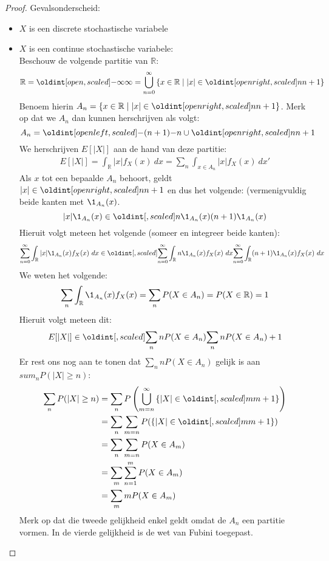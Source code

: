\documentclass[main.tex]{subfiles}
\begin{document}
\begin{st}
  \begin{proof}
    Gevalsonderscheid:
    \begin{itemize}
    \item $X$ is een discrete stochastische variabele
    \item $X$ is een continue stochastische variabele:\\
      Beschouw de volgende partitie van $\mathbb{R}$:
      \[ \mathbb{R} = \interval[open]{-\infty}{\infty} = \bigcup_{n=0}^{\infty}\left\{ x \in\mathbb{R} \mid |x| \in \interval[open right]{n}{n+1} \right\} \]
      Benoem hierin $A_{n}= \left\{ x \in\mathbb{R} \mid |x| \in \interval[open right]{n}{n+1} \right\}$.
      Merk op dat we $A_{n}$ dan kunnen herschrijven als volgt:
      \[ A_{n} = \interval[open left]{-(n+1)}{-n} \cup \interval[open right]{n}{n+1} \]
      We herschrijven $E[|X|]$ aan de hand van deze partitie:
      \begin{align}
        E[|X|]
        = \int_{\mathbb{R}}|x|f_{X}(x)\ dx
        = \sum_{n}\int_{x\in A_{n}}|x|f_{X}(x)\ dx'
      \end{align}
      Als $x$ tot een bepaalde $A_{n}$ behoort, geldt $|x| \in \interval[open right]{n}{n+1}$ en dus het volgende: (vermenigvuldig beide kanten met $\1_{A_{n}}(x)$.
      \[ |x| \1_{A_{n}}(x) \in \interval{n\1_{A_{n}}(x)}{(n+1)\1_{A_{n}}(x)} \]
      Hieruit volgt meteen het volgende (someer en integreer beide kanten):
      \[
      \sum_{n=0}^{\infty}\int_{\mathbb{R}}|x|\1_{A_{n}}(x)f_{X}(x)\ dx
      \in
      \interval
      {\sum_{n=0}^{\infty}\int_{\mathbb{R}}n\1_{A_{n}}(x)f_{X}(x)\ dx}
      {\sum_{n=0}^{\infty}\int_{\mathbb{R}}(n+1)\1_{A_{n}}(x)f_{X}(x)\ dx}
      \]
      We weten het volgende:
      \[ \sum_{n}\int_{\mathbb{R}}\1_{A_{n}}(x)f_{X}(x) = \sum_{n}P(X\in A_{n}) = P(X\in\mathbb{R}) = 1 \]
      Hieruit volgt meteen dit:
      \[ E[|X|] \in \interval{\sum_{n}nP(X\in A_{n})}{\sum_{n}nP(X\in A_{n}) + 1} \]
      Er rest ons nog aan te tonen dat $\sum_{n}nP(X\in A_{n})$ gelijk is aan $sum_{n}P(|X| \ge n)$:
      \begin{align*}
        \sum_{n}P(|X| \ge n)
        &= \sum_{n}P\left(\bigcup_{m=n}^{\infty}\left\{ |X| \in \interval{m}{m+1} \right\}\right)\\
        &= \sum_{n}\sum_{m=n}P(\left\{ |X| \in \interval{m}{m+1} \right\})\\
        &= \sum_{n}\sum_{m=n}P(X\in A_{m})\\
        &= \sum_{m}\sum_{n=1}^{m}P(X\in A_{m})\\
        &= \sum_{m}mP(X\in A_{m})
      \end{align*}
      Merk op dat die tweede gelijkheid enkel geldt omdat de $A_{n}$ een partitie vormen.
      In de vierde gelijkheid is de wet van Fubini toegepast.
    \end{itemize}
  \end{proof}
\end{st}
\end{document}
